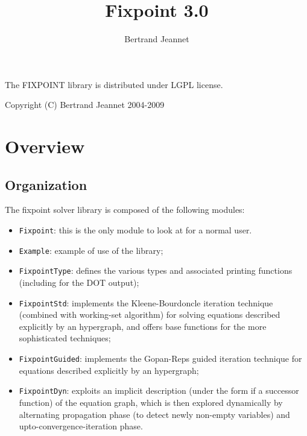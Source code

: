 \documentclass[twoside,10pt,a4paper]{report}
\title{Fixpoint 3.0}
\author{Bertrand Jeannet}
\begin{document}
\maketitle

\vspace*{0.9\textheight}

The FIXPOINT library is distributed under LGPL license.

Copyright (C) Bertrand Jeannet 2004-2009

\newpage

\tableofcontents

\chapter{Overview}

\section{Organization}

The fixpoint solver library is composed of the following modules:
\begin{itemize}\setlength{\itemsep}{0pt}
\item \texttt{Fixpoint}: this is the only module to look at for a
  normal user.
\item \texttt{Example}: example of use of the library;
\medskip

\item \texttt{FixpointType}: defines the various types and
  associated printing functions (including for the DOT output);
\item \texttt{FixpointStd}: implements the Kleene-Bourdoncle
  iteration technique \cite{bourdoncle93} (combined with
  working-set algorithm) for solving equations described
  explicitly by an hypergraph, and offers base functions for the
  more sophisticated techniques;
\item \texttt{FixpointGuided}: implements the Gopan-Reps guided
  iteration technique \cite{GopanReps07} for equations described
  explicitly by an hypergraph;
\item \texttt{FixpointDyn}: exploits an implicit description
  (under the form if a successor function) of the equation graph,
  which is then explored dynamically by alternating propagation
  phase (to detect newly non-empty variables) and
  upto-convergence-iteration phase.
\end{itemize}
\end{document}
